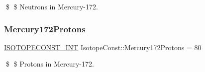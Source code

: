 \$ \$ Neutrons in Mercury-\/172. \mbox{\label{group___isotope_const-_mercury-_hg172_ga4b6b4258fff78660dc0b39f6cc9eee61}} 
\subsubsection{\texorpdfstring{Mercury172\+Protons}{Mercury172Protons}}
{\footnotesize\ttfamily \mbox{\hyperlink{group___isotope_const-_macros_ga5f18360b3e99483a35c32d789e62621c}{I\+S\+O\+T\+O\+P\+E\+C\+O\+N\+S\+T\+\_\+\+I\+NT}} Isotope\+Const\+::\+Mercury172\+Protons = 80}

\$ \$ Protons in Mercury-\/172. 